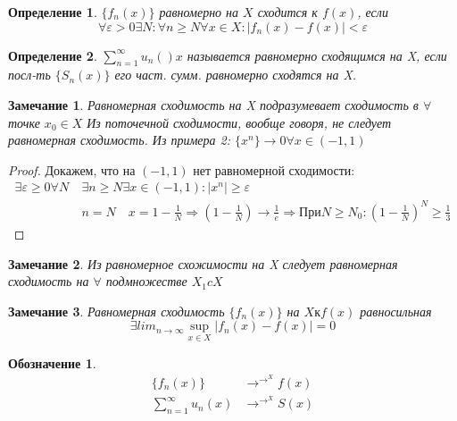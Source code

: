 \documentclass[12pt, oneside]{article}
\theoremstyle{plain}
\newtheorem{Definition}{Определение}
\newtheorem{Note}{Замечание}
\newtheorem{T}{Обозначение}
\begin{document}
\begin{Definition}
	\(\{f_n(x)\}\) равномерно на \(X\) сходится к \(f(x)\), если
	\[
		\forall \varepsilon > 0 \exists N : \forall n \geq N \forall x \in X: 
		\left|f_n(x) - f(x)\right| < \varepsilon
	\]
\end{Definition}
\begin{Definition}
	\(\sum_{n=1}^{\infty}u_n()x\) называется равномерно сходящимся на X, если
	посл-ть \(\{S_n(x)\}\) его част. сумм. равномерно сходятся на X.
\end{Definition}
\begin{Note}
	Равномерная сходимость на X подразумевает сходимость в \(\forall\) точке
	\(x_0 \in X\) Из поточечной сходимости, вообще говоря, не следует равномерная
	сходимость.
	Из примера 2: \(\{x^n\}\to 0 \forall x \in (-1, 1)\)
\end{Note}
\begin{proof}
	Докажем, что на \((-1, 1)\) нет равномерной сходимости:
	\begin{equation} \nonumber
	\begin{split}
	  \exists \varepsilon \geq 0 \forall N \ & \exists n \geq N \exists x \in (-1, 1): |x^n| \geq 
		\varepsilon\\
																		& n = N \quad x = 1 - \frac{1}{N} \Rightarrow 
																		(1 - \frac{1}{N}) \to \frac{1}{e} \Rightarrow
																		\text{При} N \geq N_0 : \left(1 - \frac{1}{N}
																		\right)^N \geq \frac{1}{3}
	\end{split}
	\end{equation}
\end{proof}
\begin{Note}
	Из равномерное схожимости на X следует равномерная сходимость на \(\forall\)
	подмножестве \(X_1 c X\)
\end{Note}
\begin{Note}
	Равномерная сходимость \(\{f_n(x)\}\) на \(X \text{к} f(x)\) равносильная
	\[
		\exists lim_{n\to\infty} \sup_{x \in X} |f_n(x) - f(x)| = 0
	\]
\end{Note}

\begin{T}
	\begin{equation} \nonumber
	\begin{split}
		\{f_n(x)\} &\to^{\to^X} f(x) \\
		\sum_{n=1}^{\infty} u_n(x) &\to^{\to^X} S(x)
	\end{split}
	\end{equation}
\end{T}
\end{document}
